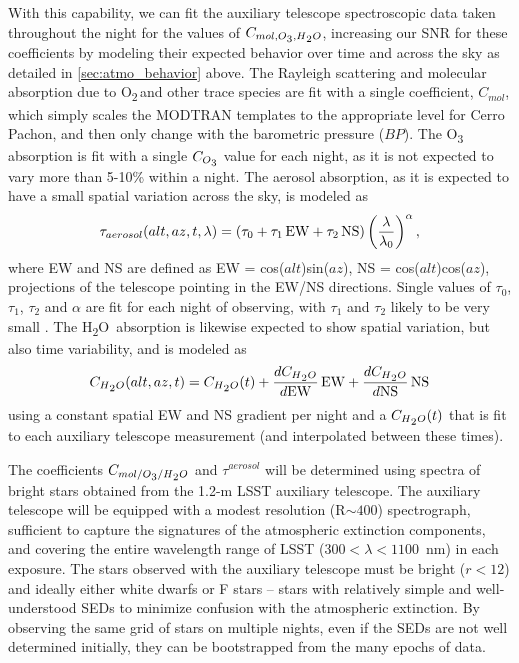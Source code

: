 \documentclass[12pt,preprint]{aastex}
\newcommand{\water}   {H\textsubscript{2}O}
\newcommand{\ozone}    {O\textsubscript{3}}
\newcommand{\oxy}     {O\textsubscript{2}}
\begin{document}
With this capability, we can fit the auxiliary telescope spectroscopic data taken
throughout the night for the values of
$C_{mol,\ozone,\water}$, increasing our SNR for these
coefficients by modeling their expected behavior over time and across
the sky as detailed in \ref{sec:atmo_behavior} above. The Rayleigh
scattering and molecular absorption due to \oxy\,and other trace
species are fit with a single coefficient, $C_{mol}$, which simply
scales the MODTRAN templates to the appropriate level for Cerro
Pachon, and then only change with the barometric pressure ($BP$). The
\ozone\,absorption is fit with a single $C_{\ozone}$ value for each
night, as it is not expected to vary more than 5-10\% within a night. 
The aerosol absorption, as it is expected to have a small
spatial variation across the sky, is modeled as 
\begin{equation}
\label{eqn:tau_aerosol}
\tau_{aerosol}(alt,az,t,\lambda) = (\tau_0 + \tau_1\,{\rm EW} +
\tau_2\,{\rm NS}) \left({\lambda \over \lambda_0}\right)^{\alpha},
\end{equation}
where EW and NS are defined as EW = cos($alt$)sin($az$), NS =
cos($alt$)cos($az$), projections of the telescope pointing in the
EW/NS directions. Single values of $\tau_0$, $\tau_1$, $\tau_2$ and $\alpha$ are
fit for each night of observing, with $\tau_1$ and
$\tau_2$ likely to be very small \citep{Burke2010b}. The \water\,
absorption is likewise expected to show spatial variation, but also
time variability, and is modeled as
\begin{equation}
\label{eqn:coeff_h2o}
C_{\water}(alt,az,t) = C_{\water}(t) + {dC_{\water} \over d{\rm EW}}\,{\rm EW} +
{dC_{\water} \over d{\rm NS}}\,{\rm NS}
\end{equation}
using a constant spatial EW and NS gradient per night and a $C_{\water}(t)$ that 
is fit to each auxiliary telescope measurement (and interpolated
between these times). 

The coefficients $C_{mol/\ozone/\water}$ and $\tau^{aerosol}$ will be
determined using spectra of bright stars obtained from the 1.2-m LSST
auxiliary telescope. The auxiliary telescope will be equipped with a
modest resolution (R$\sim400$) spectrograph, sufficient to capture the
signatures of the atmospheric extinction components, and covering the
entire wavelength range of LSST ($300<\lambda<1100$~nm) in each
exposure. The stars observed with the auxiliary telescope must be
bright ($r<12$) and ideally either white dwarfs or F stars -- stars with relatively
simple and well-understood SEDs to minimize confusion with the
atmospheric extinction. By observing the same grid of stars on
multiple nights, even if the SEDs are not well determined initially,
they can be bootstrapped from the many epochs of data. 
\end{document}
